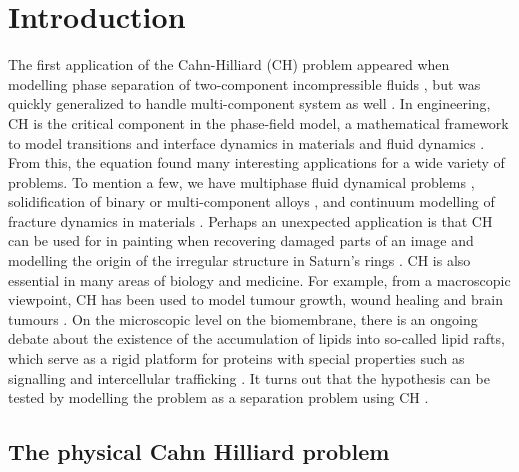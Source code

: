 \documentclass[11pt]{article}
\theoremstyle{remark}
\numberwithin{equation}{section}
\begin{document}
\newpage
\section{Introduction}\label{sec:introduction}


The first application of the Cahn-Hilliard (CH) problem appeared when modelling phase separation of two-component incompressible fluids \cite{cahn1958free, cahn1959free, cahn1961spinodal}, but was quickly generalized to handle multi-component system
as well \cite{bosch2015fractional, eyre1993systems, toth2016phase, miranville2017cahn}. In engineering, CH is the critical component in
the phase-field model, a mathematical framework to model transitions and interface dynamics in materials and fluid dynamics \cite{steinbach2009phase, chen2002phase}.
From this, the equation found many interesting applications for a wide variety of problems. To mention a few, we have
multiphase fluid dynamical problems \cite{badalassi2003computation, li2016lattice, kim2012phase, shen2010phase}, solidification of binary or multi-component alloys \cite{kim1999phase, echebarria2004quantitative}, and continuum modelling of fracture dynamics in
materials \cite{kuhn2010continuum, li2015phase}. Perhaps an unexpected application is that CH can be used for in painting when recovering damaged parts of an image \cite{bertozzi2006inpainting, burger2009cahn, bosch2015fractional, brkic2020image}
and modelling the origin of the irregular structure in Saturn's rings \cite{tremaine2003origin}.
CH is also essential in many areas of biology and medicine. For example, from a macroscopic viewpoint, CH has been used to model tumour growth, wound healing and brain tumours \cite{agosti2017cahn, cristini2009nonlinear}.
On the microscopic level on the biomembrane, there is an ongoing debate about the existence of the accumulation of lipids into so-called lipid rafts, which serve as a rigid platform for proteins with
special properties such as signalling and intercellular trafficking \cite{ levental2020lipid, hancock2006lipid, munro2003lipid, simons1997functional}. It turns out that the hypothesis can be tested by modelling the problem as a separation problem using
CH \cite{miller2020divide, garcke2016coupled, yushutin2019computational}.

\subsection{The physical Cahn Hilliard problem}%
\label{sub:the_equations}
\end{document}
